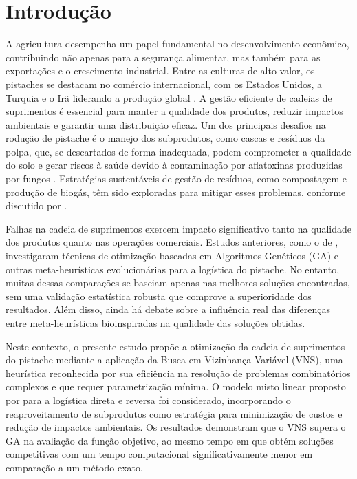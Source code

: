 \documentclass[a4paper]{ifacconf}
\begin{document}
\section{Introdução}
\label{sec:intro1}
A agricultura desempenha um papel fundamental no desenvolvimento econômico, contribuindo não apenas para a segurança alimentar, mas também para as exportações e o crescimento industrial. 
Entre as culturas de alto valor, os pistaches se destacam no comércio internacional, com os Estados Unidos, a Turquia e o Irã liderando a produção global \citep{statista2023pistachio}. 
A gestão eficiente de cadeias de suprimentos é essencial para manter a qualidade dos produtos, reduzir impactos ambientais e garantir uma distribuição eficaz. Um dos principais desafios na 
rodução de pistache é o manejo dos subprodutos, como cascas e resíduos da polpa, que, se descartados de forma inadequada, podem comprometer a qualidade do solo e gerar riscos à saúde 
devido à contaminação por aflatoxinas produzidas por fungos \citep{dronavalli2019}. Estratégias sustentáveis de gestão de resíduos, como compostagem e produção de biogás, têm sido 
exploradas para mitigar esses problemas, conforme discutido por \cite{cheraghalipour2022bi}.

Falhas na cadeia de suprimentos exercem impacto significativo tanto na qualidade dos produtos quanto nas operações comerciais. Estudos anteriores, como o de \cite{rajabi2023utilizing}, investigaram técnicas 
de otimização baseadas em Algoritmos Genéticos (GA) e outras meta-heurísticas evolucionárias para a logística do pistache. No entanto, muitas dessas comparações se baseiam apenas 
nas melhores soluções encontradas, sem uma validação estatística robusta que comprove a superioridade dos resultados. Além disso, ainda há debate sobre a influência real das 
diferenças entre meta-heurísticas bioinspiradas na qualidade das soluções obtidas.

Neste contexto, o presente estudo propõe a otimização da cadeia de suprimentos do pistache mediante a aplicação da Busca em Vizinhança Variável (VNS), uma heurística reconhecida por sua 
eficiência na resolução de problemas combinatórios complexos e que requer parametrização mínima. O modelo misto linear proposto por \cite{rajabi2023utilizing} para a logística direta e reversa foi considerado, 
incorporando o reaproveitamento de subprodutos como estratégia para minimização de custos e redução de impactos ambientais. Os resultados demonstram que o VNS supera o GA na avaliação da função objetivo, ao 
mesmo tempo em que obtém soluções competitivas com um tempo computacional significativamente menor em comparação a um método exato.
\end{document}
